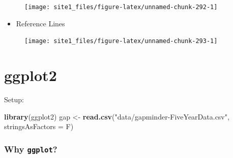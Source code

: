 \documentclass[]{book}
\newenvironment{Shaded}{\begin{snugshade}}{\end{snugshade}}
\newcommand{\CommentTok}[1]{\textcolor[rgb]{0.56,0.35,0.01}{\textit{#1}}}
\newcommand{\DataTypeTok}[1]{\textcolor[rgb]{0.13,0.29,0.53}{#1}}
\newcommand{\DecValTok}[1]{\textcolor[rgb]{0.00,0.00,0.81}{#1}}
\newcommand{\KeywordTok}[1]{\textcolor[rgb]{0.13,0.29,0.53}{\textbf{#1}}}
\newcommand{\NormalTok}[1]{#1}
\newcommand{\OperatorTok}[1]{\textcolor[rgb]{0.81,0.36,0.00}{\textbf{#1}}}
\newcommand{\StringTok}[1]{\textcolor[rgb]{0.31,0.60,0.02}{#1}}
\providecommand{\tightlist}{%
  \setlength{\itemsep}{0pt}\setlength{\parskip}{0pt}}
\begin{document}
\begin{figure}

{\centering \texttt{[image: site1\_files/figure-latex/unnamed-chunk-292-1]} 

}

\caption{ }\label{fig:unnamed-chunk-292}
\end{figure}

\begin{itemize}
\tightlist
\item
  Reference Lines
\end{itemize}

\begin{Shaded}
\end{Shaded}

\begin{figure}

{\centering \texttt{[image: site1\_files/figure-latex/unnamed-chunk-293-1]} 

}

\caption{ }\label{fig:unnamed-chunk-293}
\end{figure}

\hypertarget{ggplot2}{%
\section{ggplot2}\label{ggplot2}}

Setup:

\begin{Shaded}
\begin{Highlighting}[]
\KeywordTok{library}\NormalTok{(ggplot2)}
\NormalTok{gap <-}\StringTok{ }\KeywordTok{read.csv}\NormalTok{(}\StringTok{"data/gapminder-FiveYearData.csv"}\NormalTok{, }\DataTypeTok{stringsAsFactors =}\NormalTok{ F)}
\end{Highlighting}
\end{Shaded}

\hypertarget{why-ggplot}{%
\subsubsection*{\texorpdfstring{Why \texttt{ggplot}?}{Why ggplot?}}\label{why-ggplot}}
\end{document}
